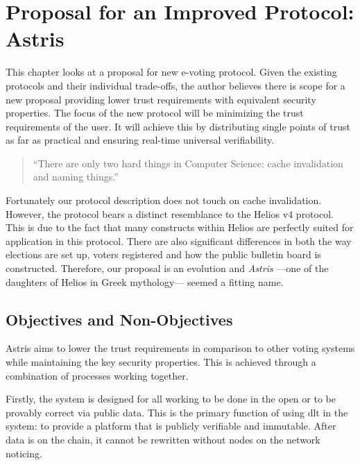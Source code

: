 
\chapter{Proposal for an Improved Protocol: Astris}
\label{ch:astris}

This chapter looks at a proposal for new e-voting protocol. Given the existing protocols and their individual trade-offs, the author believes there is scope for a new proposal providing lower trust requirements with equivalent security properties. The focus of the new protocol will be minimizing the trust requirements of the user. It will achieve this by distributing single points of trust as far as practical and ensuring real-time universal verifiability.

\begin{quote}
    ``There are only two hard things in Computer Science: cache invalidation and naming things.''

\end{quote}

Fortunately our protocol description does not touch on cache invalidation. However, the protocol bears a distinct resemblance to the Helios v4 protocol. This is due to the fact that many constructs within Helios are perfectly suited for application in this protocol. There are also significant differences in both the way elections are set up, voters registered and how the public bulletin board is constructed. Therefore, our proposal is an evolution and  \emph{Astris} ---one of the daughters of Helios in Greek mythology--- seemed a fitting name.

\section{Objectives and Non-Objectives}
\label{ch:astris:aims}

Astris aims to lower the trust requirements in comparison to other voting systems while maintaining the key security properties. This is achieved through a combination of processes working together.

Firstly, the system is designed for all working to be done in the open or to be provably correct via public data. This is the primary function of using \gls{dlt} in the system: to provide a platform that is publicly verifiable and immutable. After data is on the chain, it cannot be rewritten without nodes on the network noticing.

